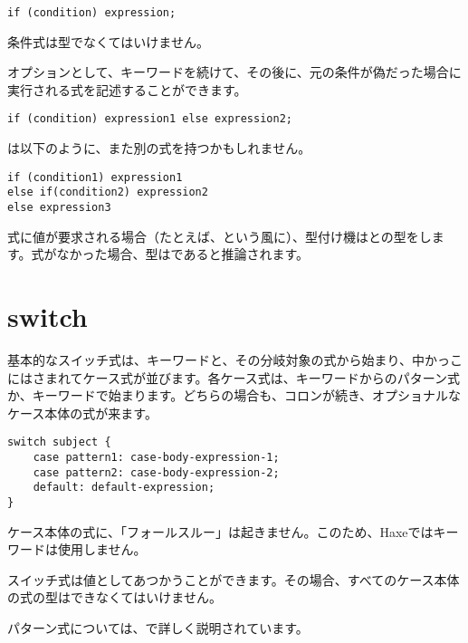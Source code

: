 \begin{lstlisting}
if (condition) expression;
\end{lstlisting}

条件式は型でなくてはいけません。

オプションとして、キーワードを続けて、その後に、元の条件が偽だった場合に実行される式を記述することができます。

\begin{lstlisting}
if (condition) expression1 else expression2;
\end{lstlisting}

は以下のように、また別の式を持つかもしれません。

\begin{lstlisting}
if (condition1) expression1
else if(condition2) expression2
else expression3
\end{lstlisting}

式に値が要求される場合（たとえば、という風に）、型付け機はとの型をします。式がなかった場合、型はであると推論されます。

\section{switch}
\label{expression-switch}

基本的なスイッチ式は、キーワードと、その分岐対象の式から始まり、中かっこ\expr{\{\}}にはさまれてケース式が並びます。各ケース式は、キーワードからのパターン式か、キーワードで始まります。どちらの場合も、コロンが続き、オプショナルなケース本体の式が来ます。

\begin{lstlisting}
switch subject {
	case pattern1: case-body-expression-1;
	case pattern2: case-body-expression-2;
	default: default-expression;
}
\end{lstlisting}

ケース本体の式に、「フォールスルー」は起きません。このため、Haxeではキーワードは使用しません。

スイッチ式は値としてあつかうことができます。その場合、すべてのケース本体の式の型はできなくてはいけません。

パターン式については、で詳しく説明されています。

